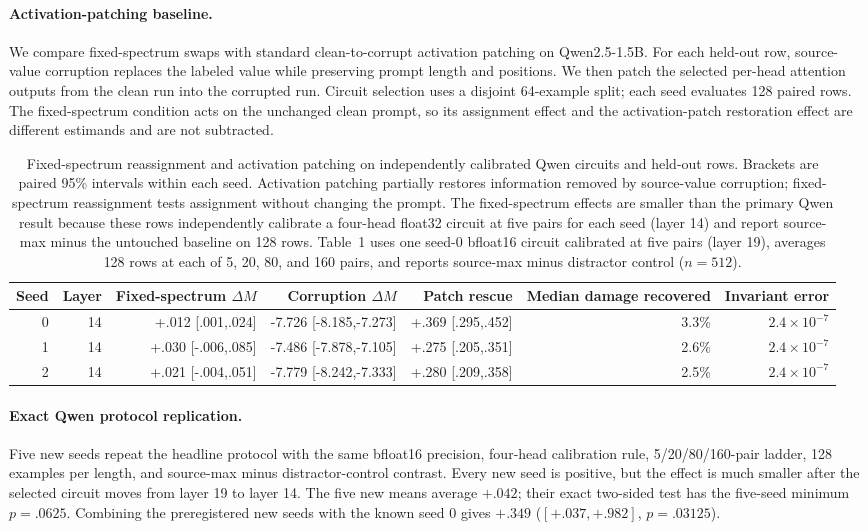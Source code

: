 \documentclass[letterpaper]{article} %
\begin{document}
\paragraph{Activation-patching baseline.}
We compare fixed-spectrum swaps with standard clean-to-corrupt activation patching on Qwen2.5-1.5B. For each held-out
row, source-value corruption replaces the labeled value while preserving prompt length and positions. We then
patch the selected per-head attention outputs from the clean run into the corrupted run. Circuit selection uses
a disjoint 64-example split; each seed evaluates 128 paired rows. The fixed-spectrum condition acts on the
unchanged clean prompt, so its assignment effect and the activation-patch restoration effect are different
estimands and are not subtracted.

\begin{table}[t]
\centering
\small
\setlength{\tabcolsep}{4.0pt}
\begin{tabular}{rrrrrrr}
\toprule
Seed & Layer & Fixed-spectrum $\Delta M$ & Corruption $\Delta M$ & Patch rescue & Median damage recovered & Invariant error \\
\midrule
0 & 14 & +.012 [.001,.024] & -7.726 [-8.185,-7.273] & +.369 [.295,.452] & 3.3\% & $2.4\times10^{-7}$ \\
1 & 14 & +.030 [-.006,.085] & -7.486 [-7.878,-7.105] & +.275 [.205,.351] & 2.6\% & $2.4\times10^{-7}$ \\
2 & 14 & +.021 [-.004,.051] & -7.779 [-8.242,-7.333] & +.280 [.209,.358] & 2.5\% & $2.4\times10^{-7}$ \\
\bottomrule
\end{tabular}
\caption{Fixed-spectrum reassignment and activation patching on independently calibrated Qwen circuits and held-out
rows. Brackets are paired 95\% intervals within each seed. Activation patching partially restores information
removed by source-value corruption; fixed-spectrum reassignment tests assignment without changing the prompt.
The fixed-spectrum effects are smaller than the primary Qwen result because these rows independently calibrate
a four-head float32 circuit at five pairs for each seed (layer 14) and report source-max minus the untouched
baseline on 128 rows. Table~1 uses one seed-0 bfloat16 circuit calibrated at five pairs (layer 19), averages
128 rows at each of 5, 20, 80, and 160 pairs, and reports source-max minus distractor control ($n=512$).}
\label{tab:supp-activation-patching}
\end{table}

\paragraph{Exact Qwen protocol replication.}
Five new seeds repeat the headline protocol with the same bfloat16 precision, four-head calibration rule,
5/20/80/160-pair ladder, 128 examples per length, and source-max minus distractor-control contrast. Every new
seed is positive, but the effect is much smaller after the selected circuit moves from layer 19 to layer 14.
The five new means average $+.042$; their exact two-sided test has the five-seed minimum $p=.0625$. Combining
the preregistered new seeds with the known seed 0 gives $+.349$ ($[+.037,+.982]$, $p=.03125$).
\end{document}
